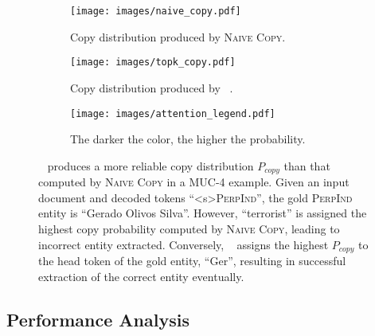\documentclass[11pt]{article}
\begin{document}
\begin{figure}[t]
    \centering
    \begin{subfigure}{0.48\textwidth}

    \texttt{[image: images/naive\_copy.pdf]}
    \caption{Copy distribution produced by \textsc{Naive Copy}. }
    \end{subfigure}
    \par\bigskip
    \begin{subfigure}[b]{0.48\textwidth}
    \texttt{[image: images/topk\_copy.pdf]}
    \caption{Copy distribution produced by \topkcopy~.}
    \end{subfigure}
    \par\bigskip
    \begin{subfigure}[b]{0.48\textwidth}
    \begin{center}
    \texttt{[image: images/attention\_legend.pdf]}
    \caption{The darker the color, the higher the probability.}
    \end{center}
    \end{subfigure}
    
    \caption{\topkcopy~ produces a more reliable copy distribution $P_{copy}$ than that computed by \textsc{Naive Copy} in a MUC-4 example. Given an input document and decoded tokens ``<s>\textsc{PerpInd}'', the gold \textsc{PerpInd} entity is ``Gerado Olivos Silva''. However, ``terrorist'' is assigned the highest copy probability computed by \textsc{Naive Copy}, leading to incorrect entity extracted. Conversely, \topkcopy~ assigns the highest $P_{copy}$ to the head token of the gold entity, ``Ger'', resulting in successful extraction of the correct entity eventually. }
    \label{fig:attention_comparison}
    \vspace{-5mm}
\end{figure}

\subsection{Performance Analysis}
\end{document}
